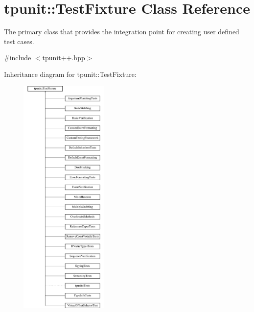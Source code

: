 \hypertarget{classtpunit_1_1TestFixture}{}\section{tpunit\+::Test\+Fixture Class Reference}
\label{classtpunit_1_1TestFixture}


The primary class that provides the integration point for creating user defined test cases.  




{\ttfamily \#include $<$tpunit++.\+hpp$>$}

Inheritance diagram for tpunit\+::Test\+Fixture\+:\begin{figure}[H]
\begin{center}
\leavevmode
\includegraphics[height=12.000000cm]{classtpunit_1_1TestFixture}
\end{center}
\end{figure}
